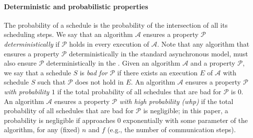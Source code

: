 \paragraph{Deterministic and probabilistic properties}
The probability of a schedule is the probability of the intersection of all its scheduling steps. 
We say that an algorithm $\mathcal{A}$ ensures a property $\mathcal{P}$ \textit{deterministically} if $\mathcal{P}$ holds in every execution of $\mathcal{A}$. Note that any algorithm that ensures a property $\mathcal{P}$ deterministically in the standard asynchronous model, must also ensure $\mathcal{P}$ deterministically in the \model.
Given an algorithm $\mathcal{A}$ and a property $\mathcal{P}$, we say that a schedule $S$ is \textit{bad for $\mathcal{P}$} if there exists an execution $E$ of $\mathcal{A}$ with schedule $S$ such that $\mathcal{P}$ does not hold in $E$.
An algorithm $\mathcal{A}$ ensures a property $\mathcal{P}$ \textit{with probability $1$} if the total probability of all schedules that are bad for $\mathcal{P}$ is $0$. 
An algorithm $\mathcal{A}$ ensures a property $\mathcal{P}$ \textit{with high probability (whp)} if the total probability of all schedules that are bad for $\mathcal{P}$ is negligible; in this paper, a probability is negligible if approaches $0$ exponentially with some parameter of the algorithm, for any (fixed) $n$ and $f$ (e.g., the number of communication steps). 
